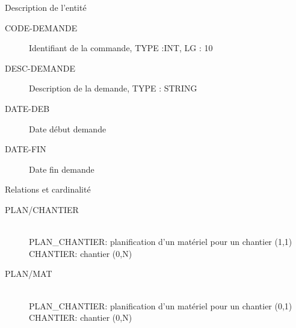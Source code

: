 \documentclass[twoside]{article}
\newcommand\el{\hfill\\}
\begin{document}
\par{Description de l'entité}
\begin{description}
    \item[CODE-DEMANDE] Identifiant de la commande, TYPE :INT, LG : 10
    \item[DESC-DEMANDE] Description de la demande, TYPE : STRING 
    \item[DATE-DEB]     Date début demande
    \item[DATE-FIN]     Date fin demande
\end{description}

\par{Relations et cardinalité}
\begin{description}
    \item[PLAN/CHANTIER]\el
        PLAN\_CHANTIER: planification d'un matériel pour un chantier (1,1)\el
        CHANTIER: chantier (0,N)
    \item[PLAN/MAT]\el
        PLAN\_CHANTIER: planification d'un matériel pour un chantier (0,1)\el
        CHANTIER: chantier (0,N)
\end{description}


\end{document}
